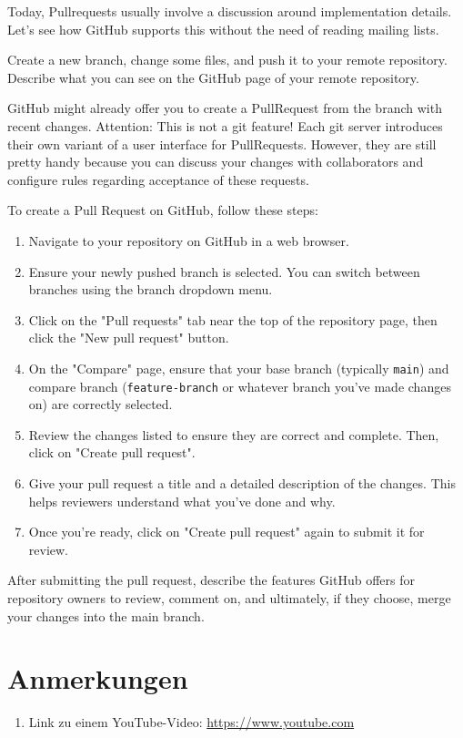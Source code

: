 \documentclass{dcbl/challenge}
\begin{document}
\begin{aufgabe}
    Today, Pullrequests usually involve a discussion around implementation details. Let's see how GitHub supports this without the need of reading mailing lists.
    
    Create a new branch, change some files, and push it to your remote repository.
    Describe what you can see on the GitHub page of your remote repository.

    GitHub might already offer you to create a PullRequest from the branch with recent changes. Attention: This is not a git feature! Each git server introduces their own variant of a user interface for PullRequests. However, they are still pretty handy because you can discuss your changes with collaborators and configure rules regarding acceptance of these requests.
    
     To create a Pull Request on GitHub, follow these steps:
    \begin{enumerate}
        \item Navigate to your repository on GitHub in a web browser.
        \item Ensure your newly pushed branch is selected. You can switch between branches using the branch dropdown menu.
        \item Click on the "Pull requests" tab near the top of the repository page, then click the "New pull request" button.
        \item On the "Compare" page, ensure that your base branch (typically \texttt{main}) and compare branch (\texttt{feature-branch} or whatever branch you've made changes on) are correctly selected.
        \item Review the changes listed to ensure they are correct and complete. Then, click on "Create pull request".
        \item Give your pull request a title and a detailed description of the changes. This helps reviewers understand what you've done and why.
        \item Once you're ready, click on "Create pull request" again to submit it for review.
    \end{enumerate}
    
    After submitting the pull request, describe the features GitHub offers for repository owners to review, comment on, and ultimately, if they choose, merge your changes into the main branch. 
\end{aufgabe}


\section*{Anmerkungen}
\begin{enumerate}
    \item Link zu einem YouTube-Video: \url{https://www.youtube.com}
\end{enumerate}
\end{document}

